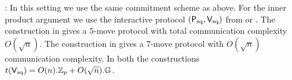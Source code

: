 : In this setting we use the same commitment scheme as above. For the inner product argument we use the interactive protocol $(\mathsf{P}_\mathrm{sq},\mathsf{V}_\mathrm{sq})$ from \cite{InnerProductDLS} or \cite{Groth09b}. The construction in \cite{InnerProductDLS} gives a $5$-move protocol with total communication complexity $O(\sqrt{n})$. The construction in \cite{Groth09b} gives a 7-move protocol with $O(\sqrt{n})$ communication complexity. In both the constructions $t(\mathsf{V}_\mathrm{sq}) = O(n).\mathbb{Z}_p +
O(\sqrt{n}).\mathbb{G}$.



